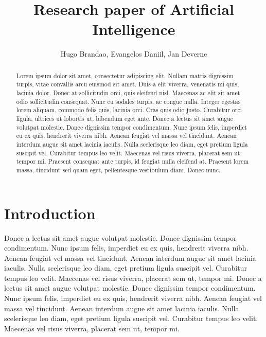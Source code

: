 \documentclass{article}
\begin{document}
\title{Research paper of Artificial Intelligence}
\author{Hugo Brandao, Evangelos Daniil, Jan Deverne}

\maketitle

\begin{abstract} 
Lorem ipsum dolor sit amet, consectetur adipiscing elit. Nullam mattis dignissim turpis, vitae convallis arcu
euismod sit amet. Duis a elit viverra, venenatis mi quis, lacinia dolor. Donec at sollicitudin orci, quis eleifend
nisl. Maecenas ac elit sit amet odio sollicitudin consequat. Nunc eu sodales turpis, ac congue nulla. Integer
egestas lorem aliquam, commodo felis quis, lacinia orci. Cras quis odio justo. Curabitur orci ligula, ultrices ut
lobortis ut, bibendum eget ante.
\vspace{5mm}
\newline
Donec a lectus sit amet augue volutpat molestie. Donec dignissim tempor condimentum. Nunc ipsum felis, imperdiet
eu ex quis, hendrerit viverra nibh. Aenean feugiat vel massa vel tincidunt. Aenean interdum augue sit amet lacinia
iaculis. Nulla scelerisque leo diam, eget pretium ligula suscipit vel. Curabitur tempus leo velit. Maecenas vel
risus viverra, placerat sem ut, tempor mi.
\vspace{5mm}
\newline
Praesent consequat ante turpis, id feugiat nulla eleifend at. Praesent lorem massa, tincidunt sed quam eget,
pellentesque vestibulum diam. Donec nunc.
\end{abstract}

\section{Introduction}
Donec a lectus sit amet augue volutpat molestie. Donec dignissim tempor condimentum. Nunc ipsum felis, imperdiet
eu ex quis, hendrerit viverra nibh. Aenean feugiat vel massa vel tincidunt. Aenean interdum augue sit amet lacinia
iaculis. Nulla scelerisque leo diam, eget pretium ligula suscipit vel. Curabitur tempus leo velit. Maecenas vel
risus viverra, placerat sem ut, tempor mi.
\vspace{5mm}
\newline
Donec a lectus sit amet augue volutpat molestie. Donec dignissim tempor condimentum. Nunc ipsum felis, imperdiet
eu ex quis, hendrerit viverra nibh. Aenean feugiat vel massa vel tincidunt. Aenean interdum augue sit amet lacinia
iaculis. Nulla scelerisque leo diam, eget pretium ligula suscipit vel. Curabitur tempus leo velit. Maecenas vel
risus viverra, placerat sem ut, tempor mi.
\end{document}

